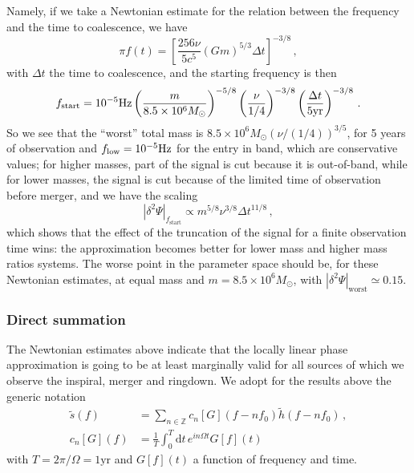 \documentclass[aps,showpacs,twocolumn,prd,superscriptaddress,nofootinbib]{revtex4}
\newcommand{\be}{\begin{equation}}
\newcommand{\ee}{\end{equation}}
\newcommand\ud{{\mathrm{d}}}
\newcommand{\nn}{\nonumber}
\newcommand{\Msol}{M_{\odot}}
\begin{document}
Namely, if we take a Newtonian estimate for the relation between the frequency and the time to coalescence, we have
%
\be
	\pi f(t) = \left[ \frac{256\nu}{5c^{5}} (Gm)^{5/3} \Delta t \right]^{-3/8} \,,
\ee
%
with $\Delta t$ the time to coalescence, and the starting frequency is then
%
\be
	f_{\rm start} = 10^{-5}\mathrm{Hz} \left( \frac{m}{8.5\times10^{6}\Msol} \right)^{-5/8} \left( \frac{\nu}{1/4} \right)^{-3/8} \left( \frac{\Delta t}{5 \mathrm{yr}} \right)^{-3/8} \,.
\ee
%
So we see that the ``worst'' total mass is $8.5\times10^6\Msol (\nu/(1/4))^{3/5}$, for 5 years of observation and $f_{\rm low} = 10^{-5}\mathrm{Hz}$ for the entry in band, which are conservative values; for higher masses, part of the signal is cut because it is out-of-band, while for lower masses, the signal is cut because of the limited time of observation before merger, and we have the scaling
%
\be
	|\delta^{2}\Psi |_{f_\mathrm{start}} \propto m^{5/8}\nu^{3/8}\Delta t^{11/8} \,,
\ee
%
which shows that the effect of the truncation of the signal for a finite observation time wins: the approximation becomes better for lower mass and higher mass ratios systems. The worse point in the parameter space should be, for these Newtonian estimates, at equal mass and $m=8.5\times 10^{6} \Msol$, with $|\delta^{2}\Psi |_{\mathrm{worst}} \simeq 0.15$.


\subsubsection*{Direct summation}

The Newtonian estimates above indicate that the locally linear phase approximation is going to be at least marginally valid for all sources of which we observe the inspiral, merger and ringdown. We adopt for the results above the generic notation
%
\begin{align}
	\tilde{s}(f) &=  \sum\limits_{n\in \mathbb{Z}} c_{n}[G]\left(f - n f_{0}\right) \tilde{h}\left(f - n f_{0}\right)\,, \nn\\
	c_{n}[G](f) &= \frac{1}{T} \int_{0}^{T}\ud t\, e^{in\Omega t} G[f](t)
\end{align}
%
with $T=2\pi/\Omega=1\mathrm{yr}$ and $G[f](t)$ a function of frequency and time.
\end{document}

